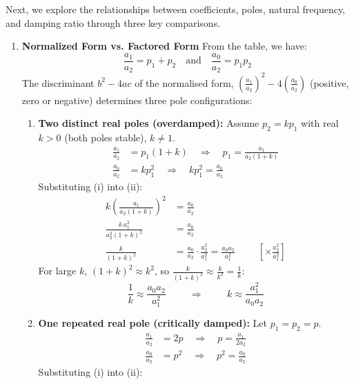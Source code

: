 Next, we explore the relationships between coefficients, poles,
natural frequency, and damping ratio through three key comparisons.
\begin{enumerate}
  \item \textbf{Normalized Form vs. Factored Form}
    \noindent From the table, we have:
    \[ \frac{a_1}{a_2} = p_1 + p_2 \quad \text{and} \quad \frac{a_0}{a_2} = p_1 p_2 \]
    The discriminant
    \(\displaystyle b^2 - 4ac\) of the normalised form, \(\left( \frac{a_1}{a_2} \right)^2 - 4 \left( \frac{a_0}{a_2} \right) \)
    (positive, zero or negative) determines three pole configurations:
    \begin{enumerate}
      \item \textbf{Two distinct real poles (overdamped):} Assume \( p_2 = k p_1 \) with real \( k > 0 \) (both poles stable), \( k \neq 1 \).
        \begin{align*}
          \frac{a_1}{a_2} &= p_1(1 + k) \quad \Rightarrow \quad p_1 = \frac{a_1}{a_2(1 + k)} \tag{i} \\
          \frac{a_0}{a_2} &= k p_1^2 \quad \Rightarrow \quad k p_1^2 = \frac{a_0}{a_2} \tag{ii}
        \end{align*}
        Substituting (i) into (ii):
        \begin{align*}
        k \left( \frac{a_1}{a_2(1 + k)} \right)^2 &= \frac{a_0}{a_2} \\
        \frac{k\, a_1^2}{a_2^2 (1 + k)^2} &= \frac{a_0}{a_2} \\
        \frac{k}{(1+k)^2} &= \frac{a_0}{a_2}\cdot\frac{a_2^2}{a_1^2} = \frac{a_0 a_2}{a_1^2} \hspace{1cm} [\times \tfrac{a_2^2}{a_1^2}]
        \end{align*}
        For large \(k\), \((1 + k)^2 \approx k^2\), so \(\frac{k}{(1+k)^2} \approx \frac{k}{k^2} = \frac{1}{k}\):
        \[ \frac{1}{k} \approx \frac{a_0 a_2}{a_1^2} \hspace{1cm} \Rightarrow \hspace{1cm} k \approx \frac{a_1^2}{a_0 a_2} \]
      \item \textbf{One repeated real pole (critically damped):} Let \( p_1 = p_2 = p \).
        \begin{align*}
          \frac{a_1}{a_2} &= 2p \quad \Rightarrow \quad p = \frac{a_1}{2a_2} \tag{i} \\
          \frac{a_0}{a_2} &= p^2 \quad \Rightarrow \quad p^2 = \frac{a_0}{a_2} \tag{ii}
        \end{align*}
        Substituting (i) into (ii):

\end{enumerate}
\end{enumerate}
